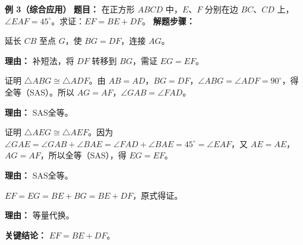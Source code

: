 \begin{examplebox}
	\medskip
	\textbf{\textcolor{CExample}{例 3（综合应用）}}
	\textbf{\textcolor{CExample}{题目：}}
	在正方形 $ABCD$ 中，$E$、$F$ 分别在边 $BC$、$CD$ 上，$\angle EAF = 45^\circ$。求证：$EF = BE + DF$。
	\textbf{\textcolor{CExample}{解题步骤：}}
	\begin{description}[style=nextline, leftmargin=2.8em, labelsep=0.5em, itemsep=0.45em]
		\item[\textbf{第一步（补短构造）：}]
			延长 $CB$ 至点 $G$，使 $BG = DF$，连接 $AG$。
			\par\textbf{理由：} 补短法，将 $DF$ 转移到 $BG$，需证 $EG = EF$。
		\item[\textbf{第二步（证全等一）：}]
			证明 $\triangle ABG \cong \triangle ADF$。由 $AB=AD$，$BG=DF$，$\angle ABG = \angle ADF = 90^\circ$，得全等（SAS）。所以 $AG=AF$，$\angle GAB = \angle FAD$。
			\par\textbf{理由：} SAS全等。
		\item[\textbf{第三步（证全等二）：}]
			证明 $\triangle AEG \cong \triangle AEF$。因为 $\angle GAE = \angle GAB + \angle BAE = \angle FAD + \angle BAE = 45^\circ = \angle EAF$，又 $AE=AE$，$AG=AF$，所以全等（SAS），得 $EG=EF$。
			\par\textbf{理由：} SAS全等。
		\item[\textbf{第四步（等量代换）：}]
			$EF = EG = BE + BG = BE + DF$，原式得证。
			\par\textbf{理由：} 等量代换。
	\end{description}
	\textbf{\textcolor{CExample}{关键结论：}}
	\textbf{$EF = BE + DF$}。
\end{examplebox}
